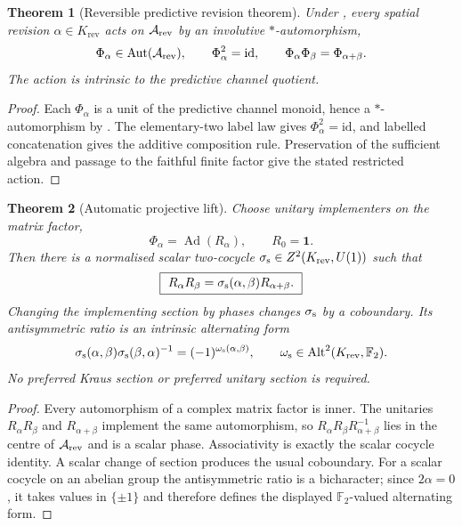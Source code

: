 \documentclass[11pt]{article}
\newtheorem{theorem}{Theorem}[section]
\theoremstyle{definition}
\theoremstyle{remark}
\newcommand{\F}{\mathbb{F}}
\newcommand{\A}{\mathcal{A}}
\newcommand{\id}{\mathrm{id}}
\newcommand{\one}{\mathbf{1}}
\newcommand{\Alt}{\operatorname{Alt}}
\begin{document}
\begin{theorem}[Reversible predictive revision theorem]
\label{thm:reversible-predictive-revision}
Under , every spatial revision
\(\alpha\in K_{\mathrm{rev}}\) acts on \(\A_{\rm rev}\) by an involutive
\(*\)-automorphism,
\[
  \Phi_\alpha\in\operatorname{Aut}(\A_{\rm rev}),
  \qquad
  \Phi_\alpha^2=\id,
  \qquad
  \Phi_\alpha\Phi_\beta=\Phi_{\alpha+\beta}.
\]
The action is intrinsic to the predictive channel quotient.
\end{theorem}

\begin{proof}
Each \(\Phi_\alpha\) is a unit of the predictive channel monoid, hence a
\(*\)-automorphism by .  The elementary-two label law
gives \(\Phi_\alpha^2=\id\), and labelled concatenation gives the additive
composition rule.  Preservation of the sufficient algebra and passage to the
faithful finite factor give the stated restricted action.
\end{proof}

\begin{theorem}[Automatic projective lift]
\label{thm:spatial-multiplier-scalar-main}
Choose unitary implementers on the matrix factor,
\[
  \Phi_\alpha=\operatorname{Ad}(R_\alpha),
  \qquad R_0=\one.
\]
Then there is a normalised scalar two-cocycle
\(\sigma_{\rm s}\in Z^2(K_{\mathrm{rev}},U(1))\) such that
\[
  \boxed{\ R_\alpha R_\beta
  =\sigma_{\rm s}(\alpha,\beta)R_{\alpha+\beta}.\ }
\]
Changing the implementing section by phases changes \(\sigma_{\rm s}\) by a
coboundary.  Its antisymmetric ratio is an intrinsic alternating form
\[
  \sigma_{\rm s}(\alpha,\beta)
  \sigma_{\rm s}(\beta,\alpha)^{-1}
  =(-1)^{\omega_{\rm s}(\alpha,\beta)},
  \qquad
  \omega_{\rm s}\in\Alt^2(K_{\mathrm{rev}},\F_2).
\]
No preferred Kraus section or preferred unitary section is required.
\end{theorem}

\begin{proof}
Every automorphism of a complex matrix factor is inner.  The unitaries
\(R_\alpha R_\beta\) and \(R_{\alpha+\beta}\) implement the same automorphism,
so \(R_\alpha R_\beta R_{\alpha+\beta}^{-1}\) lies in the centre of
\(\A_{\rm rev}\) and is a scalar phase.  Associativity is exactly the scalar
cocycle identity.  A scalar change of section produces the usual coboundary.
For a scalar cocycle on an abelian group the antisymmetric ratio is a
bicharacter; since \(2\alpha=0\), it takes values in \(\{\pm1\}\) and therefore
defines the displayed \(\F_2\)-valued alternating form.
\end{proof}
\end{document}
